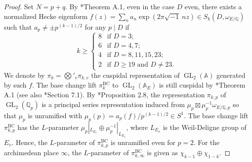 \documentclass[11pt]{amsart}
\theoremstyle{plain}
\theoremstyle{definition}
\numberwithin{equation}{section}
\def\GL{\mathop{\mathrm{GL}}\nolimits}
\def\exp{\mathop{\mathrm{exp}}\nolimits}
\newcommand{\bbA}{\mathbb{A}}
\newcommand{\bbQ}{\mathbb{Q}}
\newcommand{\BC}{\mathrm{BC}}
\begin{document}
\begin{proof}
Set $N = p+q$.
By \cite{2025_HMY_Kodaira_dimension_ball_quotients}*{Theorem A.1}, even in the case $D$ even, there exists a normalized Hecke eigenform $f(z) = \sum_{n} a_n \exp(2\pi \sqrt{-1}\ nz) \in S_k(D, \omega_{E/\bbQ})$ such that $a_p \neq \pm p^{(k-1)/2}$ for any $p \mid D$ if 
\[
    k \geq 
    \begin{cases}
            8 & \text{if $D = 3$;}\\
            6 & \text{if $D=4, 7$;}\\
            4 & \text{if $D=8,11,15,23$;}\\
            2 & \text{if $D \geq 19$ and $D \neq 23$.}
    \end{cases}
\]
We denote by $\pi_k = \bigotimes'_v \pi_{k,v}$ the cuspidal representation of $\GL_2(\bbA)$ generated by such $f$.
The base change lift $\pi_k^\BC$ to $\GL_2(\bbA_E)$ is still cuspidal by \cite{2025_HMY_Kodaira_dimension_ball_quotients}*{Theorem A.1} (see also \cite{2025_HMY_Kodaira_dimension_ball_quotients}*{Section 7.1}).
By \cite{2012_Loeffer-Weinstein}*{Proposition 2.8}, the representation $\pi_{k,p}$ of $\GL_2(\bbQ_p)$ is a principal series representation induced from $\mu_p \boxtimes \mu_p^{-1}\omega_{E/\bbQ,p}$ so that $\mu_p$ is unramified with $\mu_p(p) = a_p(f)/p^{(k-1)/2} \in S^1$.
The base change lift $\pi_{k,p}^\BC$ has the $L$-parameter $\mu_p|_{L_{E_v}} \oplus \mu_p^{-1}|_{L_{E_v}}$, where $L_{E_v}$ is the Weil-Deligne group of $E_v$.
Hence, the $L$-parameter of $\pi_{k,p}^\BC$ is unramified even for $p=2$.
For the archimedean place $\infty$, the $L$-parameter of $\pi_{k,\infty}^\BC$ is given as $\chi_{k-1} \oplus \chi_{1-k}$.





\end{proof}
\end{document}
